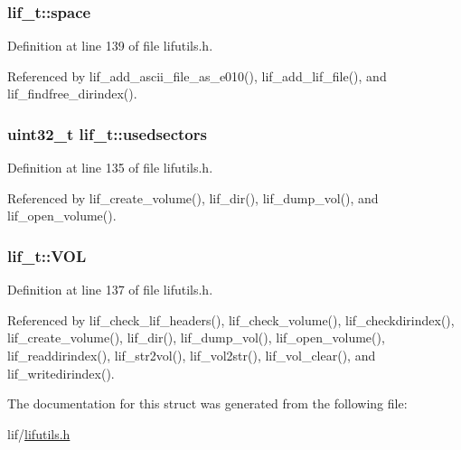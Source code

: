 \subsubsection[{\texorpdfstring{space}{space}}]{ lif\+\_\+t\+::space}\hypertarget{structlif__t_a627408f7370fc24c1b4839f7976b72dd}{}\label{structlif__t_a627408f7370fc24c1b4839f7976b72dd}


Definition at line 139 of file lifutils.\+h.



Referenced by lif\+\_\+add\+\_\+ascii\+\_\+file\+\_\+as\+\_\+e010(), lif\+\_\+add\+\_\+lif\+\_\+file(), and lif\+\_\+findfree\+\_\+dirindex().

\subsubsection[{\texorpdfstring{usedsectors}{usedsectors}}]{\setlength{\rightskip}{0pt plus 5cm}uint32\+\_\+t lif\+\_\+t\+::usedsectors}\hypertarget{structlif__t_ad81767a2f65b997d5abecba130b89814}{}\label{structlif__t_ad81767a2f65b997d5abecba130b89814}


Definition at line 135 of file lifutils.\+h.



Referenced by lif\+\_\+create\+\_\+volume(), lif\+\_\+dir(), lif\+\_\+dump\+\_\+vol(), and lif\+\_\+open\+\_\+volume().

\subsubsection[{\texorpdfstring{V\+OL}{VOL}}]{ lif\+\_\+t\+::\+V\+OL}\hypertarget{structlif__t_ae68126d2b9261ef9a6903a95d5c82cac}{}\label{structlif__t_ae68126d2b9261ef9a6903a95d5c82cac}


Definition at line 137 of file lifutils.\+h.



Referenced by lif\+\_\+check\+\_\+lif\+\_\+headers(), lif\+\_\+check\+\_\+volume(), lif\+\_\+checkdirindex(), lif\+\_\+create\+\_\+volume(), lif\+\_\+dir(), lif\+\_\+dump\+\_\+vol(), lif\+\_\+open\+\_\+volume(), lif\+\_\+readdirindex(), lif\+\_\+str2vol(), lif\+\_\+vol2str(), lif\+\_\+vol\+\_\+clear(), and lif\+\_\+writedirindex().



The documentation for this struct was generated from the following file\+:\begin{DoxyCompactItemize}
\item 
lif/\hyperlink{lifutils_8h}{lifutils.\+h}\end{DoxyCompactItemize}
